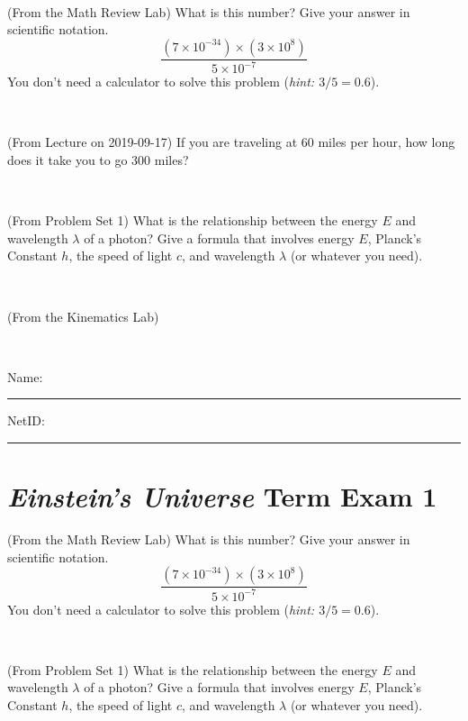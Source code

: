 \documentclass[12pt, letterpaper]{article}
\begin{document}
\vfill ~


\clearpage


\begin{problem} (From the Math Review Lab)
What is this number? Give your answer in scientific notation.
$$
\frac{(7\times10^{-34})\times(3\times10^8)}{5\times10^{-7}}
$$
You don't need a calculator to solve this problem (\textit{hint: $3/5=0.6$}).
\end{problem}


\vfill ~

\begin{problem} (From Lecture on 2019-09-17)
If you are traveling at 60 miles per hour, how long does
it take you to go 300 miles?
\end{problem}


\vfill ~

\begin{problem} (From Problem Set 1)
What is the relationship between the energy $E$ and wavelength
$\lambda$ of a photon? Give a formula that involves energy $E$,
Planck's Constant $h$, the speed of light $c$, and wavelength
$\lambda$ (or whatever you need).
\end{problem}

\vfill ~

\begin{problem} (From the Kinematics Lab)

\end{problem}


\vfill ~


\cleardoublepage



\noindent
Name: \rule[-1ex]{0.60\textwidth}{0.1pt}
NetID: \rule[-1ex]{0.20\textwidth}{0.1pt}

\section*{\textsl{Einstein's Universe} Term Exam 1}
\setcounter{problem}{1}


\begin{problem} (From the Math Review Lab)
What is this number? Give your answer in scientific notation.
$$
\frac{(7\times10^{-34})\times(3\times10^8)}{5\times10^{-7}}
$$
You don't need a calculator to solve this problem (\textit{hint: $3/5=0.6$}).
\end{problem}


\vfill ~

\begin{problem} (From Problem Set 1)
What is the relationship between the energy $E$ and wavelength
$\lambda$ of a photon? Give a formula that involves energy $E$,
Planck's Constant $h$, the speed of light $c$, and wavelength
$\lambda$ (or whatever you need).
\end{problem}
\end{document}
